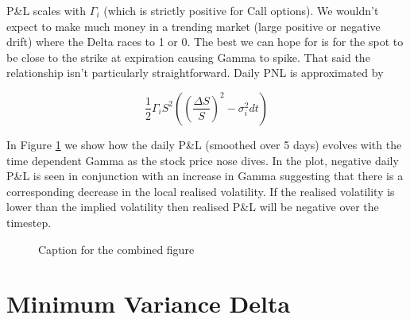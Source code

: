 \documentclass{article}
\begin{document}
P\&L scales with $\Gamma_i$ (which is strictly positive for Call options). We wouldn't expect to make much money in a trending market (large positive or negative drift)
where the Delta races to 1 or 0. The best we can hope for is for the spot to be close to the strike at expiration causing Gamma to spike. That said the relationship isn't 
particularly straightforward. Daily PNL is approximated by 

\[
    \frac{1}{2}\Gamma_i S^2 ((\frac{\Delta S}{S})^2 - \sigma_i^2 dt)
\]

In Figure \ref{fig:gamma} we show how the daily P\&L (smoothed over 5 days) evolves with the time dependent Gamma as the stock price nose dives.
In the plot, negative daily P\&L is seen in conjunction with an increase in Gamma suggesting that there is a corresponding decrease in the local realised volatility. If 
the realised volatility is lower than the implied volatility then realised P\&L will be negative over the timestep. 


\begin{figure}[h]
    \centering
    \hfill
    \caption{Caption for the combined figure}
    \label{fig:gamma}
\end{figure}
 
\newpage

\section{Minimum Variance Delta}
\end{document}
